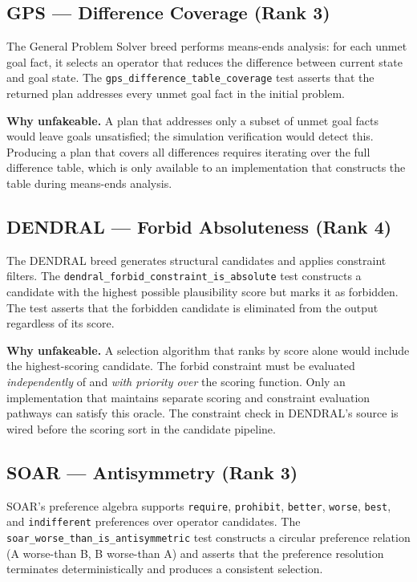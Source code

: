 \subsection{GPS --- Difference Coverage (Rank 3)}
\label{subsec:gps-oracle}

The General Problem Solver breed performs means-ends analysis: for each unmet goal fact, it
selects an operator that reduces the difference between current state and goal state. The
\texttt{gps\_difference\_table\_coverage} test asserts that the returned plan addresses every
unmet goal fact in the initial problem.

\textbf{Why unfakeable.} A plan that addresses only a subset of unmet goal facts would leave
goals unsatisfied; the simulation verification would detect this. Producing a plan that covers
all differences requires iterating over the full difference table, which is only available to
an implementation that constructs the table during means-ends analysis.

\subsection{DENDRAL --- Forbid Absoluteness (Rank 4)}
\label{subsec:dendral-oracle}

The DENDRAL breed generates structural candidates and applies constraint filters. The
\texttt{dendral\_forbid\_constraint\_is\_absolute} test constructs a candidate with the
highest possible plausibility score but marks it as forbidden. The test asserts that the
forbidden candidate is eliminated from the output regardless of its score.

\textbf{Why unfakeable.} A selection algorithm that ranks by score alone would include the
highest-scoring candidate. The forbid constraint must be evaluated \emph{independently} of and
\emph{with priority over} the scoring function. Only an implementation that maintains separate
scoring and constraint evaluation pathways can satisfy this oracle. The constraint check in
DENDRAL's source is wired before the scoring sort in the candidate pipeline.

\subsection{SOAR --- Antisymmetry (Rank 3)}
\label{subsec:soar-oracle}

SOAR's preference algebra supports \texttt{require}, \texttt{prohibit}, \texttt{better},
\texttt{worse}, \texttt{best}, and \texttt{indifferent} preferences over operator candidates.
The \texttt{soar\_worse\_than\_is\_antisymmetric} test constructs a circular preference
relation (A worse-than B, B worse-than A) and asserts that the preference resolution
terminates deterministically and produces a consistent selection.

